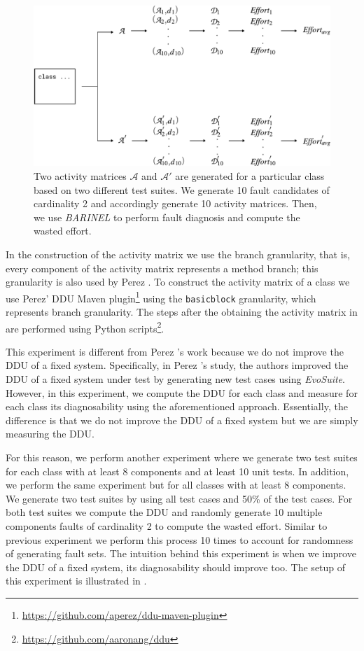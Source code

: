 \documentclass[twoside,a4paper,11pt]{memoir}
\begin{document}
\begin{figure}
  \includegraphics[width=\linewidth]{figures/fault_generation_delta}
  \caption{Two activity matrices $\mathcal{A}$ and $\mathcal{A}'$ are generated for a particular class based on two different test suites. We generate 10 fault candidates of cardinality 2 and accordingly generate 10 activity matrices. Then, we use \emph{BARINEL} to perform fault diagnosis and compute the wasted effort.}
  \label{fig:fault_generation_delta}
\end{figure}

In the construction of the activity matrix we use the branch granularity, that is, every component of the activity matrix represents a method branch; this granularity is also used by Perez \etal \cite{DBLP:conf/icse/PerezAD17}.
To construct the activity matrix of a class we use Perez' DDU Maven plugin\footnote{\url{https://github.com/aperez/ddu-maven-plugin}} using the \texttt{basicblock} granularity, which represents branch granularity.
The steps after the obtaining the activity matrix in  are performed using Python scripts\footnote{\url{https://github.com/aaronang/ddu}}.

This experiment is different from Perez \etal's work because we do not improve the DDU of a fixed system.
Specifically, in Perez \etal's study, the authors improved the DDU of a fixed system under test by generating new test cases using \emph{EvoSuite}.
However, in this experiment, we compute the DDU for each class and measure for each class its diagnosability using the aforementioned approach.
Essentially, the difference is that we do not improve the DDU of a fixed system but we are simply measuring the DDU.



For this reason, we perform another experiment where we generate two test suites for each class with at least 8 components and at least 10 unit tests.
In addition, we perform the same experiment but for all classes with at least 8 components.
We generate two test suites by using all test cases and 50\% of the test cases.
For both test suites we compute the DDU and randomly generate 10 multiple components faults of cardinality 2 to compute the wasted effort.
Similar to previous experiment we perform this process 10 times to account for randomness of generating fault sets.
The intuition behind this experiment is when we improve the DDU of a fixed system, its diagnosability should improve too.
The setup of this experiment is illustrated in .
\end{document}
